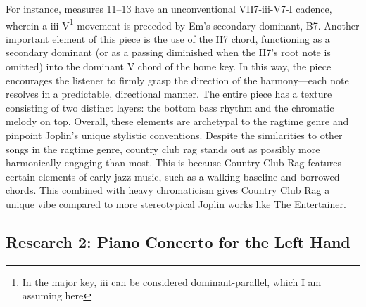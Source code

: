 \documentclass[11pt,a4paper]{article}
\begin{document}
For instance, measures 11–13 have an unconventional VII7-iii-V7-I cadence, wherein a iii-V\footnote{In the major key, iii can be considered dominant-parallel, which I am assuming here} movement is preceded by Em's secondary dominant, B7. Another important element of this piece is the use of the II7 chord, functioning as a secondary dominant (or as a passing diminished when the II7’s root note is omitted) into the dominant V chord of the home key. In this way, the piece encourages the listener to firmly grasp the direction of the harmony—each note resolves in a predictable, directional manner. The entire piece has a texture consisting of two distinct layers: the bottom bass rhythm and the chromatic melody on top. Overall, these elements are archetypal to the ragtime genre and pinpoint Joplin’s unique stylistic conventions. Despite the similarities to other songs in the ragtime genre, country club rag stands out as possibly more harmonically engaging than most. This is because Country Club Rag features certain elements of early jazz music, such as a walking baseline and borrowed chords. This combined with heavy chromaticism gives Country Club Rag a unique vibe compared to more stereotypical Joplin works like The Entertainer.\autocite{joplin}


\subsection{Research 2: Piano Concerto for the Left Hand}
\end{document}
